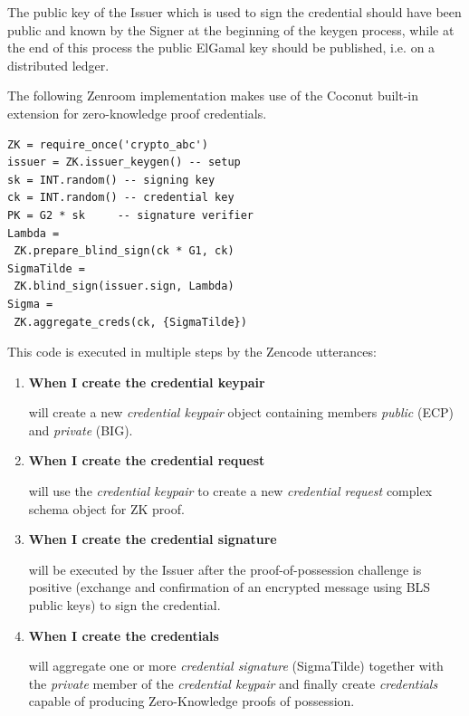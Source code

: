 \documentclass[twocolumn]{article}
\begin{document}
The public key of the Issuer which is used to sign the credential
should have been public and known by the Signer at the beginning of
the keygen process, while at the end of this process the public
ElGamal key should be published, i.e. on a distributed ledger.

The following Zenroom implementation makes use of the Coconut
built-in extension for zero-knowledge proof credentials.

\begin{lstlisting}[basicstyle=\tiny,style=lua]
ZK = require_once('crypto_abc')
issuer = ZK.issuer_keygen() -- setup
sk = INT.random() -- signing key
ck = INT.random() -- credential key
PK = G2 * sk     -- signature verifier
Lambda =
 ZK.prepare_blind_sign(ck * G1, ck)
SigmaTilde =
 ZK.blind_sign(issuer.sign, Lambda)
Sigma =
 ZK.aggregate_creds(ck, {SigmaTilde})
\end{lstlisting}

This code is executed in multiple steps by the Zencode utterances:

\begin{enumerate}

\item \textbf{When I create the credential keypair}

  will create a new \emph{credential keypair} object containing
  members \emph{public} (ECP) and \emph{private} (BIG).

\item \textbf{When I create the credential request}

  will use the \emph{credential keypair} to create a new
  \emph{credential request} complex schema object for ZK proof.

\item \textbf{When I create the credential signature}

  will be executed by the Issuer after the proof-of-possession
  challenge is positive (exchange and confirmation of an encrypted
  message using BLS public keys) to sign the credential.

\item \textbf{When I create the credentials}

  will aggregate one or more \emph{credential signature} (SigmaTilde)
  together with the \emph{private} member of the \emph{credential
    keypair} and finally create \emph{credentials} capable of
  producing Zero-Knowledge proofs of possession.

\end{enumerate}
\end{document}
